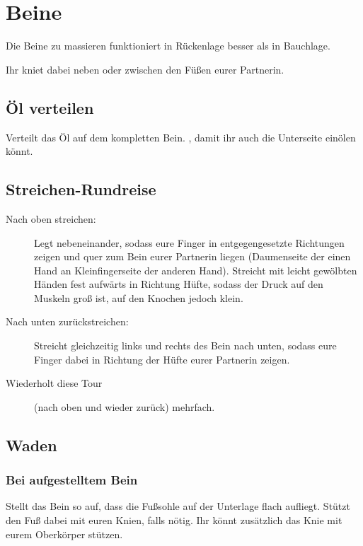 \section{Beine}

Die Beine zu massieren funktioniert in Rückenlage besser als in Bauchlage.

Ihr kniet dabei neben oder zwischen den Füßen eurer Partnerin.

\subsection{Öl verteilen}
Verteilt das Öl auf dem kompletten Bein. , damit ihr auch die Unterseite einölen könnt.

\subsection{Streichen-Rundreise}
\begin{oframed}
  \begin{description}
    \item [Nach oben streichen:] Legt  nebeneinander, sodass eure Finger in entgegengesetzte Richtungen zeigen und quer zum Bein eurer Partnerin liegen (Daumenseite der einen Hand an Kleinfingerseite der anderen Hand). Streicht mit leicht gewölbten Händen fest aufwärts in Richtung Hüfte, sodass der Druck auf den Muskeln groß ist, auf den Knochen jedoch klein.
    \item [Nach unten zurückstreichen:] Streicht gleichzeitig links und rechts des Bein nach unten, sodass eure Finger dabei in Richtung der Hüfte eurer Partnerin zeigen.
    \item [Wiederholt diese Tour] (nach oben und wieder zurück) mehrfach.
  \end{description}
\end{oframed}

\pagebreak
\subsection{Waden}

\subsubsection{Bei aufgestelltem Bein}

Stellt das Bein so auf, dass die Fußsohle auf der Unterlage flach aufliegt. Stützt den Fuß dabei mit euren Knien, falls nötig. Ihr könnt zusätzlich das Knie mit eurem Oberkörper stützen.

